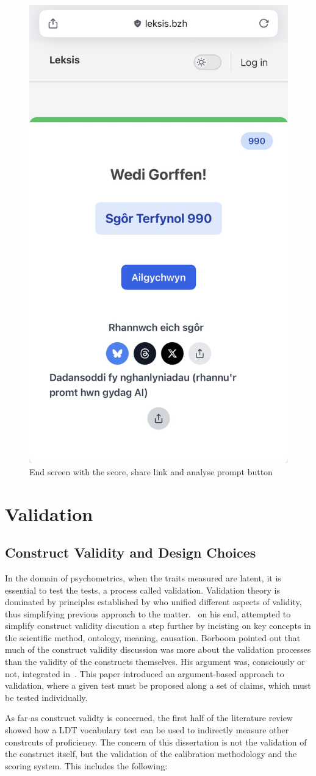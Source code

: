 \begin{figure}[htbp]
    \centering
    \includegraphics[height=0.7\textwidth]{figures/end-screen.jpg}
    \caption{End screen with the score, share link and analyse prompt button}
\end{figure}\label{fig:endscreen}

\section{Validation}
\subsection{Construct Validity and Design Choices}
In the domain of psychometrics, when the traits measured are latent, it is essential to test the tests, a process called validation. Validation theory is dominated by principles established by \textcite{messick_validity_1987} who unified different aspects of validity, thus simplifying previous approach to the matter.\ \textcite{borsboom_concept_2004} on his end, attempted to simplify construct validity discution a step further by incisting on key concepts in the scientific method, ontology, meaning, causation. Borboom pointed out that much of the construct validity discussion was more about the validation processes than the validity of the constructs themselves. His argument was, consciously or not, integrated in~\cite{kane_validating_2013}. This paper introduced an argument-based approach to validation, where a given test must be proposed along a set of claims, which must be tested individually.

As far as construct validty is concerned, the first half of the literature review showed how a LDT vocabulary test can be used to indirectly measure other constrcuts of proficiency. The concern of this dissertation is not the validation of the construct itself, but the validation of the calibration methodology and the scoring system. This includes the following:

